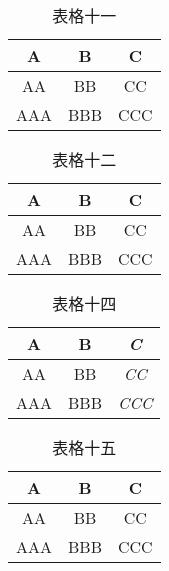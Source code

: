 \documentclass[a4paper,12pt]{article}%
\begin{document}
\begin{table}[htbp]
\centering
\caption{表格十}
\end{table}

\begin{table}[htbp]
\centering
\caption{表格十一}
\renewcommand{\arraystretch}{1.5}
\begin{tabular}{ccc}\toprule
A&B&C\\ \midrule
AA&BB&CC\\
AAA&BBB&CCC\\ \bottomrule
\end{tabular}
\end{table}

\begin{table}[htbp]
\centering
\caption{表格十二}
\renewcommand{\arraystretch}{0}
\begin{tabular}{ccc}\toprule
A&B&C\\ \midrule
AA&BB&CC\\
AAA&BBB&CCC\\ \bottomrule
\end{tabular}
\end{table}

\begin{table}[htbp]
\centering
\caption{表格十三}
\end{table}

\begin{table}[htbp]
\centering
\caption{表格十四}
\begin{tabular}{>{\scshape}cc>{\itshape}c}\toprule
A&B&C\\ \midrule
AA&BB&CC\\
AAA&BBB&CCC\\ \bottomrule
\end{tabular}
\end{table}

\begin{table}[htbp]
\centering
\caption{表格十五}
\begin{tabular}{ics}\toprule
A&B&C\\ \midrule
AA&BB&CC\\
AAA&BBB&CCC\\ \bottomrule
\end{tabular}
\end{table}
\end{document}
